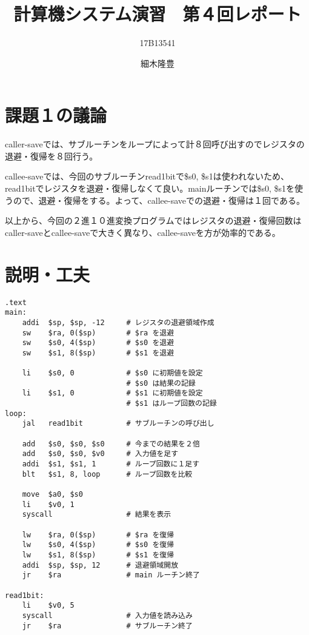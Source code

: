 \documentclass{jarticle}
\title{計算機システム演習　第４回レポート}
\author{17B13541 \and 細木隆豊}
\date{}
\begin{document}
\maketitle
  \section{課題１の議論}
    caller-saveでは、サブルーチンをループによって計８回呼び出すのでレジスタの退避・復帰を８回行う。

    callee-saveでは、今回のサブルーチンread1bitで\$s0, \$s1は使われないため、read1bitでレジスタを退避・復帰しなくて良い。mainルーチンでは\$s0, \$s1を使うので、退避・復帰をする。よって、callee-saveでの退避・復帰は１回である。

    以上から、今回の２進１０進変換プログラムではレジスタの退避・復帰回数はcaller-saveとcallee-saveで大きく異なり、callee-saveを方が効率的である。
  \section{説明・工夫}
    \begin{lstlisting}[caption=assignment1.s]
    .text
main:
    addi  $sp, $sp, -12     # レジスタの退避領域作成
    sw    $ra, 0($sp)       # $ra を退避
    sw    $s0, 4($sp)       # $s0 を退避
    sw    $s1, 8($sp)       # $s1 を退避

    li    $s0, 0            # $s0 に初期値を設定
                            # $s0 は結果の記録
    li    $s1, 0            # $s1 に初期値を設定
                            # $s1 はループ回数の記録
loop:
    jal   read1bit          # サブルーチンの呼び出し

    add   $s0, $s0, $s0     # 今までの結果を２倍
    add   $s0, $s0, $v0     # 入力値を足す
    addi  $s1, $s1, 1       # ループ回数に１足す
    blt   $s1, 8, loop      # ループ回数を比較

    move  $a0, $s0
    li    $v0, 1
    syscall                 # 結果を表示

    lw    $ra, 0($sp)       # $ra を復帰
    lw    $s0, 4($sp)       # $s0 を復帰
    lw    $s1, 8($sp)       # $s1 を復帰
    addi  $sp, $sp, 12      # 退避領域開放
    jr    $ra               # main ルーチン終了

read1bit:
    li    $v0, 5
    syscall                 # 入力値を読み込み
    jr    $ra               # サブルーチン終了
    \end{lstlisting}
\end{document}
